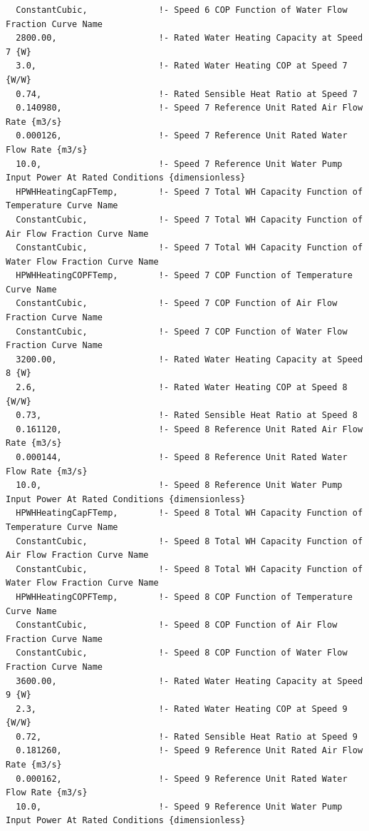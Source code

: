 \begin{lstlisting}
  ConstantCubic,              !- Speed 6 COP Function of Water Flow Fraction Curve Name
  2800.00,                    !- Rated Water Heating Capacity at Speed 7 {W}
  3.0,                        !- Rated Water Heating COP at Speed 7 {W/W}
  0.74,                       !- Rated Sensible Heat Ratio at Speed 7
  0.140980,                   !- Speed 7 Reference Unit Rated Air Flow Rate {m3/s}
  0.000126,                   !- Speed 7 Reference Unit Rated Water Flow Rate {m3/s}
  10.0,                       !- Speed 7 Reference Unit Water Pump Input Power At Rated Conditions {dimensionless}
  HPWHHeatingCapFTemp,        !- Speed 7 Total WH Capacity Function of Temperature Curve Name
  ConstantCubic,              !- Speed 7 Total WH Capacity Function of Air Flow Fraction Curve Name
  ConstantCubic,              !- Speed 7 Total WH Capacity Function of Water Flow Fraction Curve Name
  HPWHHeatingCOPFTemp,        !- Speed 7 COP Function of Temperature Curve Name
  ConstantCubic,              !- Speed 7 COP Function of Air Flow Fraction Curve Name
  ConstantCubic,              !- Speed 7 COP Function of Water Flow Fraction Curve Name
  3200.00,                    !- Rated Water Heating Capacity at Speed 8 {W}
  2.6,                        !- Rated Water Heating COP at Speed 8 {W/W}
  0.73,                       !- Rated Sensible Heat Ratio at Speed 8
  0.161120,                   !- Speed 8 Reference Unit Rated Air Flow Rate {m3/s}
  0.000144,                   !- Speed 8 Reference Unit Rated Water Flow Rate {m3/s}
  10.0,                       !- Speed 8 Reference Unit Water Pump Input Power At Rated Conditions {dimensionless}
  HPWHHeatingCapFTemp,        !- Speed 8 Total WH Capacity Function of Temperature Curve Name
  ConstantCubic,              !- Speed 8 Total WH Capacity Function of Air Flow Fraction Curve Name
  ConstantCubic,              !- Speed 8 Total WH Capacity Function of Water Flow Fraction Curve Name
  HPWHHeatingCOPFTemp,        !- Speed 8 COP Function of Temperature Curve Name
  ConstantCubic,              !- Speed 8 COP Function of Air Flow Fraction Curve Name
  ConstantCubic,              !- Speed 8 COP Function of Water Flow Fraction Curve Name
  3600.00,                    !- Rated Water Heating Capacity at Speed 9 {W}
  2.3,                        !- Rated Water Heating COP at Speed 9 {W/W}
  0.72,                       !- Rated Sensible Heat Ratio at Speed 9
  0.181260,                   !- Speed 9 Reference Unit Rated Air Flow Rate {m3/s}
  0.000162,                   !- Speed 9 Reference Unit Rated Water Flow Rate {m3/s}
  10.0,                       !- Speed 9 Reference Unit Water Pump Input Power At Rated Conditions {dimensionless}

\end{lstlisting}
